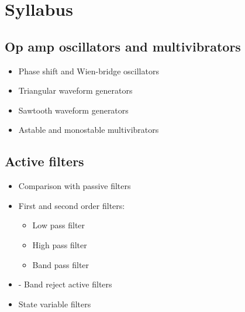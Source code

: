 \documentclass[../course]{subfiles}
\begin{document}
\section{Syllabus}

\subsection{Op amp oscillators and multivibrators}

\begin{itemize}
    \item Phase shift and Wien-bridge oscillators
    \item Triangular waveform generators
    \item Sawtooth waveform generators
    \item Astable and monostable multivibrators
\end{itemize}

\subsection{Active filters}

\begin{itemize}
    \item Comparison with passive filters
    \item First and second order filters:

        \begin{itemize}
            \item Low pass filter
            \item High pass filter
            \item Band pass filter
        \end{itemize}

    \item- Band reject active filters
    \item State variable filters
\end{itemize}
\end{document}
